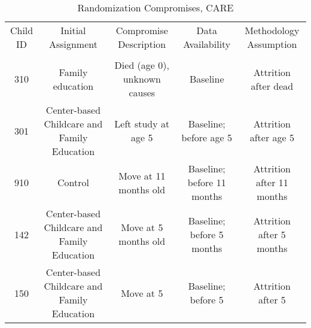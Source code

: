 \begin{sidewaystable}[H] 
\begin{threeparttable}
\caption{Randomization Compromises, CARE}
\label{table:care_compromises}
\centering
\footnotesize
\begin{tabular}{ccccc} \toprule
Child ID & Initial Assignment & Compromise Description & Data Availability & Methodology Assumption \\ \\ \midrule
310 & Family education & Died (age 0), unknown causes & Baseline & Attrition after dead \\
301 & Center-based Childcare and Family Education  & Left study at age 5  & Baseline; before age 5 & Attrition after age 5 \\
910 & Control & Move at 11 months old & Baseline; before 11 months & Attrition after 11 months \\
142 & Center-based Childcare and Family Education & Move at 5 months old & Baseline; before 5 months & Attrition after 5 months \\
150 & Center-based Childcare and Family Education & Move at 5 & Baseline; before 5 & Attrition after 5 \\ \bottomrule
\end{tabular}
\end{threeparttable}
\end{sidewaystable}